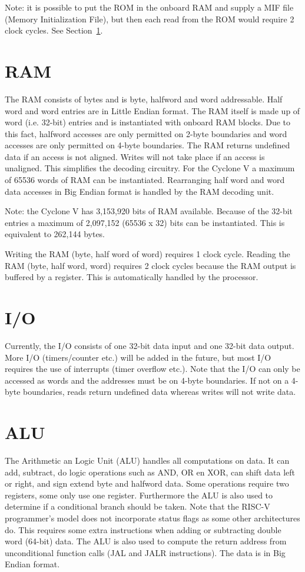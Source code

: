 \documentclass[12pt]{article}
\begin{document}
Note: it is possible to put the ROM in the onboard RAM and supply a MIF file (Memory Initialization File), but then each read from the ROM would require 2 clock cycles. See Section~\ref{sec:ram}.

\section{RAM}
\label{sec:ram}
The RAM consists of bytes and is byte, halfword and word addressable. Half word and word entries are in Little Endian format. The RAM itself is made up of word (i.e. 32-bit) entries and is instantiated with onboard RAM blocks. Due to this fact, halfword accesses are only permitted on 2-byte boundaries and word accesses are only permitted on 4-byte boundaries. The RAM returns undefined data if an access is not aligned. Writes will not take place if an access is unaligned. This simplifies the decoding circuitry. For the Cyclone V a maximum of 65536 words of RAM can be instantiated. Rearranging half word and word data accesses in Big Endian format is handled by the RAM decoding unit.

Note: the Cyclone V has 3,153,920 bits of RAM available. Because of the 32-bit entries a maximum of 2,097,152 (65536 x 32) bits can be instantiated. This is equivalent to 262,144 bytes.

Writing the RAM (byte, half word of word) requires 1 clock cycle. Reading the RAM (byte, half word, word) requires 2 clock cycles because the RAM output is buffered by a register. This is automatically handled by the processor.

\section{I/O}
\label{sec/io}
Currently, the I/O consists of one 32-bit data input and one 32-bit data output. More I/O (timers/counter etc.) will be added in the future, but most I/O requires the use of interrupts (timer overflow etc.). Note that the I/O can only be accessed as words and the addresses must be on 4-byte boundaries. If not on a 4-byte boundaries, reads return undefined data whereas writes will not write data.

\section{ALU}
\label{sec:alu}
The Arithmetic an Logic Unit (ALU) handles all computations on data. It can add, subtract, do logic operations such as AND, OR en XOR, can shift data left or right, and sign extend byte and halfword data. Some operations require two registers, some only use one register. Furthermore the ALU is also used to determine if a conditional branch should be taken. Note that the RISC-V programmer's model does not incorporate status flags as some other architectures do. This requires some extra instructions when adding or subtracting double word (64-bit) data. The ALU is also used to compute the return address from unconditional function calls (JAL and JALR instructions). The data is in Big Endian format.
\end{document}
